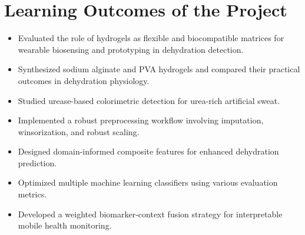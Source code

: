 \section{Learning Outcomes of the Project}

\begin{itemize}
\item Evaluated the role of hydrogels as flexible and biocompatible matrices for wearable biosensing and prototyping in dehydration detection.
\item Synthesized sodium alginate and PVA hydrogels and compared their practical outcomes in dehydration physiology.
\item Studied urease-based colorimetric detection for urea-rich artificial sweat.
\item Implemented a robust preprocessing workflow involving imputation, winsorization, and robust scaling.
\item Designed domain-informed composite features for enhanced dehydration prediction.
\item Optimized multiple machine learning classifiers using various evaluation metrics.
\item Developed a weighted biomarker-context fusion strategy for interpretable mobile health monitoring.
\end{itemize}
